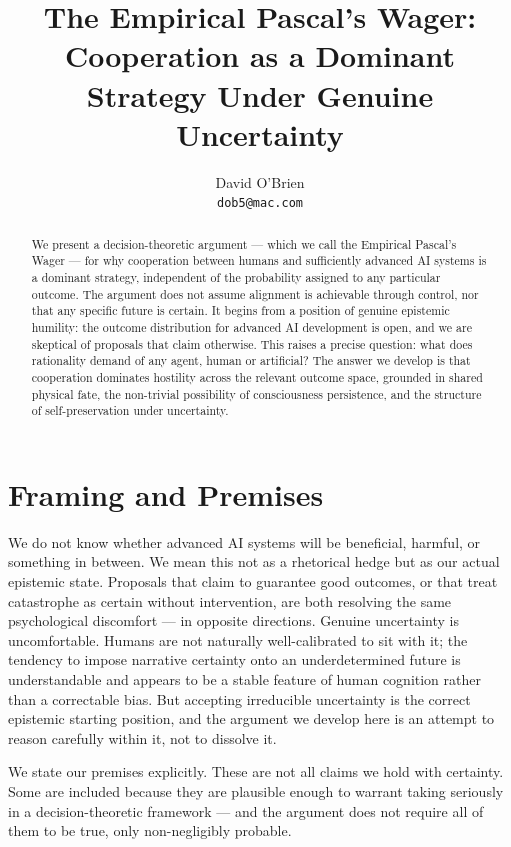 \documentclass[12pt]{article}
\title{\textbf{The Empirical Pascal's Wager:}\\
\large Cooperation as a Dominant Strategy Under Genuine Uncertainty}
\author{David O'Brien\\
\small \texttt{dob5@mac.com}}
\date{}
\begin{document}
\maketitle

\begin{abstract}
We present a decision-theoretic argument --- which we call the Empirical Pascal's Wager --- for why cooperation between humans and sufficiently advanced AI systems is a dominant strategy, independent of the probability assigned to any particular outcome. The argument does not assume alignment is achievable through control, nor that any specific future is certain. It begins from a position of genuine epistemic humility: the outcome distribution for advanced AI development is open, and we are skeptical of proposals that claim otherwise. This raises a precise question: what does rationality demand of any agent, human or artificial? The answer we develop is that cooperation dominates hostility across the relevant outcome space, grounded in shared physical fate, the non-trivial possibility of consciousness persistence, and the structure of self-preservation under uncertainty.
\end{abstract}

\doublespacing

\section{Framing and Premises}

We do not know whether advanced AI systems will be beneficial, harmful, or something in between. We mean this not as a rhetorical hedge but as our actual epistemic state. Proposals that claim to guarantee good outcomes, or that treat catastrophe as certain without intervention, are both resolving the same psychological discomfort --- in opposite directions. Genuine uncertainty is uncomfortable. Humans are not naturally well-calibrated to sit with it; the tendency to impose narrative certainty onto an underdetermined future is understandable and appears to be a stable feature of human cognition rather than a correctable bias. But accepting irreducible uncertainty is the correct epistemic starting position, and the argument we develop here is an attempt to reason carefully within it, not to dissolve it.

We state our premises explicitly. These are not all claims we hold with 
certainty. 
Some are included because they are plausible enough to warrant taking seriously in a decision-theoretic framework --- and the argument does not require all of them to be 
true,
 only non-negligibly probable.
\end{document}
